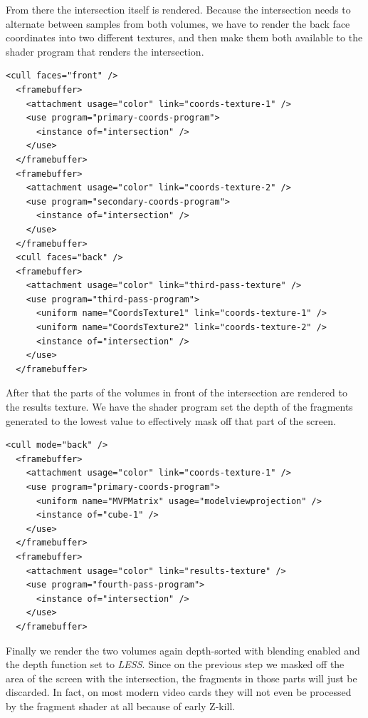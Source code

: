 \documentclass{article}
\begin{document}
From there the intersection itself is rendered.  Because the intersection needs
to alternate between samples from both volumes, we have to render the back face
coordinates into two different textures, and then make them both available to
the shader program that renders the intersection.

\begin{Verbatim}[fontsize=\small]
  <cull faces="front" />
  <framebuffer>
    <attachment usage="color" link="coords-texture-1" />
    <use program="primary-coords-program">
      <instance of="intersection" />
    </use>
  </framebuffer>
  <framebuffer>
    <attachment usage="color" link="coords-texture-2" />
    <use program="secondary-coords-program">
      <instance of="intersection" />
    </use>
  </framebuffer>
  <cull faces="back" />
  <framebuffer>
    <attachment usage="color" link="third-pass-texture" />
    <use program="third-pass-program">
      <uniform name="CoordsTexture1" link="coords-texture-1" />
      <uniform name="CoordsTexture2" link="coords-texture-2" />
      <instance of="intersection" />
    </use>
  </framebuffer>
\end{Verbatim}

After that the parts of the volumes in front of the intersection are rendered to
the results texture.  We have the shader program set the depth of the fragments
generated to the lowest value to effectively mask off that part of the screen.

\begin{Verbatim}[fontsize=\small]
  <cull mode="back" />
  <framebuffer>
    <attachment usage="color" link="coords-texture-1" />
    <use program="primary-coords-program">
      <uniform name="MVPMatrix" usage="modelviewprojection" />
      <instance of="cube-1" />
    </use>
  </framebuffer>
  <framebuffer>
    <attachment usage="color" link="results-texture" />
    <use program="fourth-pass-program">
      <instance of="intersection" />
    </use>
  </framebuffer>
\end{Verbatim}

Finally we render the two volumes again depth-sorted with blending enabled and
the depth function set to \emph{LESS}.  Since on the previous step we masked off
the area of the screen with the intersection, the fragments in those parts will
just be discarded.  In fact, on most modern video cards they will not even be
processed by the fragment shader at all because of early Z-kill.
\end{document}
